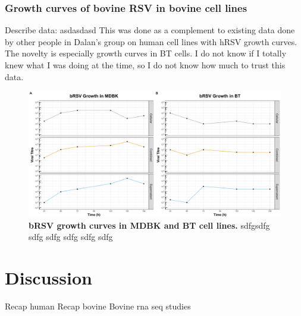 \subsubsection{Growth curves of bovine RSV in bovine cell lines} \label{Growth curves of bovine RSV in bovine cell lines}
Describe data: \newline
asdasdasd \newline
This was done as a complement to existing data done by other people in Dalan’s group on human cell lines with hRSV growth curves. The novelty is especially growth curves in BT cells. I do not know if I totally knew what I was doing at the time, so I do not know how much to trust this data.  

\begin{figure}
    \centering
    \includegraphics[width=1\linewidth]{07. Chapter 2/Figs/01. Technologies/01. growth_curves.pdf}
    \caption[bRSV growth curves in MDBK and BT cell lines.]{\textbf{bRSV growth curves in MDBK and BT cell lines.} sdfgsdfg sdfg sdfg sdfg sdfg sdfg }
    \label{bRSV growth curves in MDBK and BT cell lines}
\end{figure}




\section{Discussion} \label{Discussion-Chapter2}
Recap human \newline
Recap bovine \newline
Bovine rna seq studies



